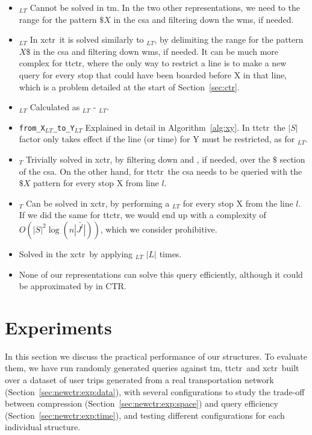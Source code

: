 \begin{itemize}
        \item \texttt{\startX$_{LT}$} Cannot be solved in \gls{tm}. In the two other representations, we need to the range for the pattern $\$X$ in the \gls{csa} and filtering down the \gls{wm}s, if needed.
        \item \texttt{\endX$_{LT}$} In \gls{xctr}~it is solved similarly to \texttt{\startX$_{LT}$}, by delimiting the range for the pattern $X\$$ in the \gls{csa} and filtering down \gls{wm}s, if needed. It can be much more complex for \gls{ttctr}, where the only way to restrict a line is to make a new query for every stop that could have been boarded before X in that line, which is a problem detailed at the start of Section~\ref{sec:ctr}.
        \item \texttt{\switchX$_{LT}$} Calculated as \boardX$_{LT}$ - \startX$_{LT}$.
        \item \texttt{from\_X$_{LT}$\_to\_Y$_{LT}$} Explained in detail in Algorithm~\ref{alg:xy}. In \gls{ttctr}~the $|S|$ factor only takes effect if the line (or time) for Y must be restricted, as for \texttt{\endX$_{LT}$}.
        \item \texttt{\startL$_T$} Trivially solved in \gls{xctr}, by filtering down  and , if needed, over the $\$$ section of the \gls{csa}. On the other hand, for \gls{ttctr}~the \gls{csa} needs to be queried with the $\$X$ pattern for every stop X from line $l$.
        \item \texttt{\endL$_T$} Can be solved in \gls{xctr}, by performing a \endX$_{LT}$ for every stop X from the line $l$. If we did the same for \gls{ttctr}, we would end up with a complexity of $O(|S|^2\log(n\bar{|J^l|}))$, which we consider prohibitive.
        \item \texttt{\startT} Solved in the \gls{xctr}~by applying \texttt{\startX$_{LT}$} $|L|$ times.
        \item \texttt{\endT} None of our representations can solve this query efficiently, although it could be approximated by \texttt{\startT} in CTR.
    \end{itemize}
	
\section{Experiments}
\label{sec:newctr:exp}
	In this section we discuss the practical performance of our structures. To evaluate them, we have run randomly generated queries against \gls{tm}, \gls{ttctr}~and \gls{xctr}~built over a dataset of user trips generated from a real transportation network (Section~\ref{sec:newctr:exp:data}), with several configurations to study the trade-off between compression (Section~\ref{sec:newctr:exp:space}) and query efficiency (Section~\ref{sec:newctr:exp:time}), and testing different configurations for each individual structure.

